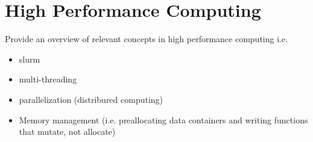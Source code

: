\chapter{High Performance Computing}


Provide an overview of relevant concepts in high performance computing i.e.
\begin{itemize}
\item slurm
\item multi-threading
\item parallelization (distribured computing)
\item Memory management (i.e. preallocating data containers and writing functions that mutate, not allocate)
\end{itemize}

